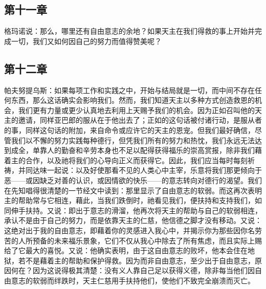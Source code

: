 
\subsection{第十一章}

\par

格玛诺说：那么，哪里还有自由意志的余地？如果天主在我们得救的事上开始并完成一切，我们又如何因自己的努力而值得赞美呢？\par


\subsection{第十二章}

\par

帕夫努提乌斯：如果每项工作和实践之中，开始与结局就是一切，而中间不存在任何东西，那么这话确实会影响我们。然而，我们知道天主以多种方式创造救恩的机会，我们更有力量或更少认真地去利用上天赐予我们的机会。因为正如召叫他的天主的邀请，同样亚巴郎的服从在于他出去了；正如的这句话被付诸行动，是服从者的事，同样这句话的附加，来自命令或应许它的天主的恩宠。但我们最好确信，尽管我们以不懈的努力实践每种德行，但凭我们所有的努力和热忱，我们永远无法达到成全，单靠人的勤奋和辛劳本身也不足以配得获得福乐的崇高赏报，除非我们藉着主的合作，以及祂将我们的心导向正义而获得它。因此，我们应当每时每刻祈祷，并同达味一起说：以及好使那看不见的人类心中主宰，乐意将我们那更倾向于恶——或因缺乏对善的认识，或因情欲的快乐——的意志转向对德行的渴望。我们在先知唱得很清楚的一节经文中读到：那里显示了自由意志的软弱。而这再次表明主的帮助常与它相连，藉此，当我们跌倒时，祂看见我们，便扶持和支持我们，如同伸手扶持。又说：即出于意志的滑溜，他再次将天主的帮助与自己的软弱相连，承认不是由于自己的努力，而是依靠天主的仁慈，他信德之脚才没有移动。又说：这绝对出于我的自由意志，即藉着你的灵感进入我心中，并揭示你为那些因你名劳苦的人所预备的未来福乐景象，它们不仅从我心中除去了所有焦虑，而且实际上赐给了它最大的喜悦。又说：他确实表明，由于这自由意志的败坏，他本会住在地狱，若不是藉着主的帮助和保护得救。因为而非自由意志，至少出于自由意志，原因何在？因为这说得极其清楚：没有义人靠自己足以获得义德，除非每当他们因自由意志的软弱而绊跌时，天主仁慈用手扶持他们，使他们不致完全崩溃而灭亡。\par

